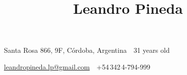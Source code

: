 \documentclass[letterpaper,MMMyyyy,nonstop]{simpleresumecv}
\newcommand{\CVAuthor}{Leandro Pineda}
\begin{document}

\title{\CVAuthor}
\vspace{.5cm}
\begin{subtitle}
Santa Rosa 866, 9F, Córdoba, Argentina\, \SubBulletSymbol\, 31 years old
\par
\hspace{-4cm}\href{mailto:leandropineda.lp@gmail.com}
{leandropineda.lp@gmail.com}
\,\SubBulletSymbol\,
+54\,342\,4-794-999
\end{subtitle}
 
\hspace{14.5cm}
\end{document}
